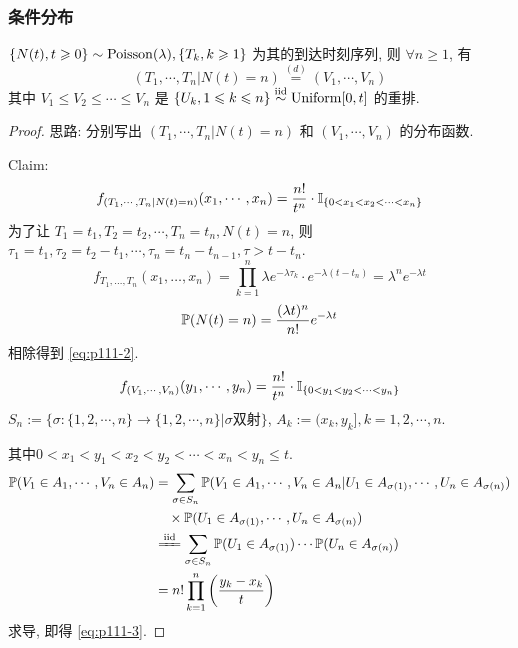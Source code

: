 \subsubsection{条件分布}

\begin{theorem}[到达时刻的条件分布]\label{thm:2.14}
    $\{N(t),t\geqslant 0\}\sim\operatorname{Poisson}(\lambda), \{T_k,k\geqslant 1\}$ 为其的到达时刻序列, 则 $\forall n\geq 1$, 有
    \begin{equation}
        (T_1,\cdots,T_n|N(t)=n)\overset{(d)}{=}(V_1,\cdots,V_n)
        \label{eq:p111-1}
    \end{equation}
    其中 $V_1\leq V_2\leq \cdots\leq V_n$ 是 $\{U_k,1\leqslant k\leqslant n\}\overset{\text{iid}}{\sim}\operatorname{Uniform}[0,t]$ 的重排.
\end{theorem}

\begin{proof}
思路: 分别写出 $(T_1,\cdots,T_n|N(t)=n)$ 和 $(V_1,\cdots,V_n)$ 的分布函数.

    Claim: 
    \begin{equation}
        f_{(T_1,\cdots,T_n|N(t)=n)}(x_1,\cdots,x_n)=\frac{n!}{t^n}\cdot\mathbb I_{\{0<x_1<x_2<\cdots<x_n\}}
        \label{eq:p111-2}
    \end{equation}
    为了让 $T_1=t_1, T_2=t_2,\cdots,T_n=t_n,N(t)=n$, 则 $\tau_1=t_1,\tau_2=t_2-t_1,\cdots,\tau_n=t_n-t_{n-1},\tau>t-t_n$.
    \[
        f_{T_1,\dots,T_n}(x_1,\dots,x_n) = \prod_{k=1}^n\lambda e^{-\lambda \tau_k}\cdot e^{-\lambda(t-t_n)}= \lambda^n e^{-\lambda t}
    \]
    \[
        \mathbb{P}(N(t)=n) = \frac{(\lambda t)^n}{n!} e^{-\lambda t}
    \]
    相除得到 \eqref{eq:p111-2}.
    \begin{equation}
        f_{(V_1,\cdots,V_n)}(y_1,\cdots,y_n)=\frac{n!}{t^n}\cdot\mathbb I_{\{0<y_1<y_2<\cdots<y_n\}}
        \label{eq:p111-3}
    \end{equation}
    $S_n:=\{\sigma:\{1,2,\cdots,n\}\to\{1,2,\cdots,n\}|\sigma\text{双射}\}$, $A_k:=(x_k,y_k],k=1,2,\cdots,n$. 
    
    其中$0<x_1<y_1<x_2<y_2<\cdots<x_n<y_n\leq t$.
    \[
    \begin{aligned}
        \PP(V_1\in A_1,\cdots,V_n\in A_n) &=\sum_{\sigma\in S_n}\PP(V_1\in A_1,\cdots,V_n\in A_n|U_1\in A_{\sigma(1)},\cdots,U_n\in A_{\sigma(n)})\\
        &\quad \times \PP(U_1\in A_{\sigma(1)},\cdots,U_n\in A_{\sigma(n)})\\
        &\xlongequal{\text{iid}}\sum_{\sigma\in S_n}\PP(U_1\in A_{\sigma(1)})\cdots \PP(U_n\in A_{\sigma(n)})\\
        &=n!\prod_{k=1}^n \left(\frac{y_k-x_k}{t}\right)
    \end{aligned}
    \]
    求导, 即得 \eqref{eq:p111-3}.
\end{proof}

